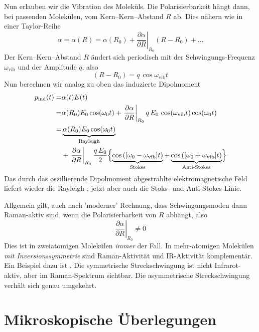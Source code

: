 Nun erlauben wir die Vibration des Moleküls. Die Polarisierbarkeit hängt dann, bei passenden Molekülen, vom Kern--Kern--Abstand $R$ ab. Dies nähern wie in einer Taylor-Reihe
\begin{equation}
\alpha = \alpha(R) = \alpha(R_0) + \left. \frac{\partial \alpha}{\partial R} \right|_{R_0}  \left( R - R_0 \right) + \dots
\end{equation}
Der Kern--Kern--Abstand $R$ ändert sich periodisch mit der Schwingungs-Frequenz $\omega_\text{vib}$ und der Amplitude $q$, also
\begin{equation}
\left( R - R_0 \right) = q \, \cos \omega_\text{vib} t
\end{equation}
Nun berechnen wir analog zu oben das induzierte Dipolmoment
\begin{align}
p_\text{ind}(t) = & \alpha(t) E(t) \\
= & \alpha(R_0) E_0 \cos(\omega_0 t) +
\left. \frac{\partial \alpha}{\partial R} \right|_{R_0}   q \,  E_0 \, \cos (\omega_\text{vib} t)  \cos(\omega_0 t) \\
= & \underbrace{  \alpha(R_0) E_0 \cos(\omega_0 t) }_\text{Rayleigh} \\
& + \left. \frac{\partial \alpha}{\partial R} \right|_{R_0}  \frac{ q \,  E_0 }{2} 
\Bigl\{ 
\underbrace{ \cos \left( [\omega_0 -\omega_\text{vib}] t \right)}_\text{Stokes}  +  \underbrace{\cos \left( [\omega_0 + \omega_\text{vib}] t \right)  
}_\text{Anti-Stokes} 
\Bigr\} 
\nonumber
\end{align}
Das durch das oszillierende Dipolmoment abgestrahlte elektromagnetische Feld liefert wieder die Rayleigh-, jetzt aber auch die Stoks- und Anti-Stokes-Linie.

Allgemein gilt, auch nach 'moderner' Rechnung, dass Schwingungsmoden dann Raman-aktiv sind, wenn die  Polarisierbarkeit von $R$ abhängt, also 
\begin{equation}
\left. \frac{\partial \alpha}{\partial R} \right|_{R_0} \neq 0
\end{equation}
Dies ist in zweiatomigen Molekülen \emph{immer} der Fall. In mehr-atomigen Molekülen \emph{mit Inversionssymmetrie} sind Raman-Aktivität und IR-Aktivität komplementär. Ein Beispiel dazu ist . Die symmetrische Streckschwingung ist nicht Infrarot-aktiv, aber im Raman-Spektrum sichtbar. Die asymmetrische Streckschwingung verhält sich genau umgekehrt.


\section{Mikroskopische Überlegungen}

